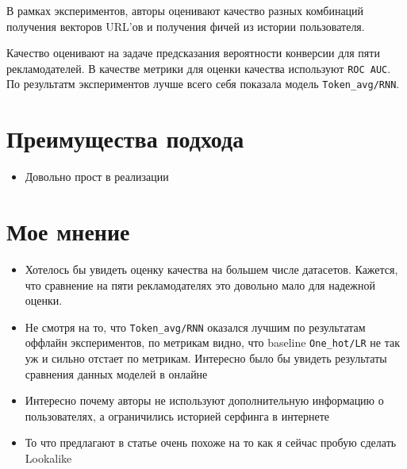 В рамках экспериментов, авторы оценивают качество разных комбинаций получения векторов URL'ов и получения фичей из истории пользователя.

Качество оценивают на задаче предсказания вероятности конверсии для пяти рекламодателей. В качестве метрики для оценки качества используют \texttt{ROC AUC}. \\

По результатм экспериментов лучше всего себя показала модель \texttt{Token\_avg/RNN}.

\section*{Преимущества подхода}

\begin{itemize}
    \item Довольно прост в реализации
\end{itemize}

\section*{Мое мнение}

\begin{itemize}
    \item Хотелось бы увидеть оценку качества на большем числе датасетов. Кажется, что сравнение на пяти рекламодателях это довольно мало для надежной оценки.
    \item Не смотря на то, что \texttt{Token\_avg/RNN} оказался лучшим по результатам оффлайн экспериментов, по метрикам видно, что baseline \texttt{One\_hot/LR} не так уж и сильно отстает по метрикам. Интересно было бы увидеть результаты сравнения данных моделей в онлайне
    \item Интересно почему авторы не используют дополнительную информацию о пользователях, а ограничились историей серфинга в интернете
    \item То что предлагают в статье очень похоже на то как я сейчас пробую сделать Lookalike
\end{itemize}

